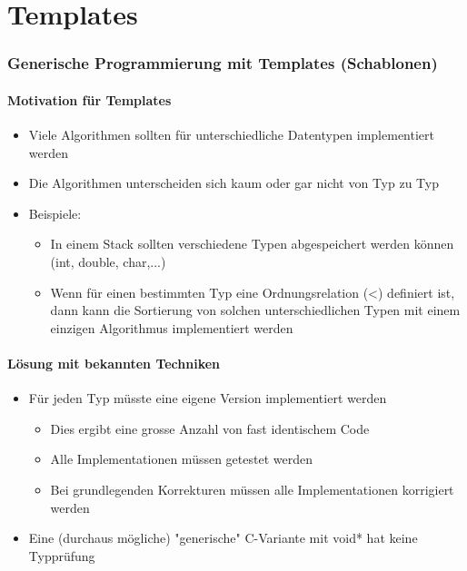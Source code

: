
\part{Templates}
\label{sec:Templates}

\section{Generische Programmierung mit Templates (Schablonen)}
\label{sec:Generische Programmierung mit Templates (Schablonen)}

\subsection{Motivation für Templates}
\label{sec:Motivation für Templates}
\begin{itemize}
	\item Viele Algorithmen sollten für unterschiedliche Datentypen implementiert werden
	\item Die Algorithmen unterscheiden sich kaum oder gar nicht von Typ zu Typ
	\item Beispiele:
	\begin{itemize}
		\item In einem Stack sollten verschiedene Typen abgespeichert werden können (int, double, char,...)
		\item Wenn für einen bestimmten Typ eine Ordnungsrelation (<) definiert ist, dann kann die Sortierung von solchen unterschiedlichen Typen mit einem einzigen Algorithmus implementiert werden
	\end{itemize}
\end{itemize}

\subsection{Lösung mit bekannten Techniken}
\label{sec:Lösung mit bekannten Techniken}
\begin{itemize}
	\item Für jeden Typ müsste eine eigene Version implementiert werden
	\begin{itemize}
		\item Dies ergibt eine grosse Anzahl von fast identischem Code
		\item Alle Implementationen müssen getestet werden
		\item Bei grundlegenden Korrekturen müssen alle Implementationen korrigiert werden
	\end{itemize}
	\item Eine (durchaus mögliche) "generische" C-Variante mit void* hat keine Typprüfung
\end{itemize}

